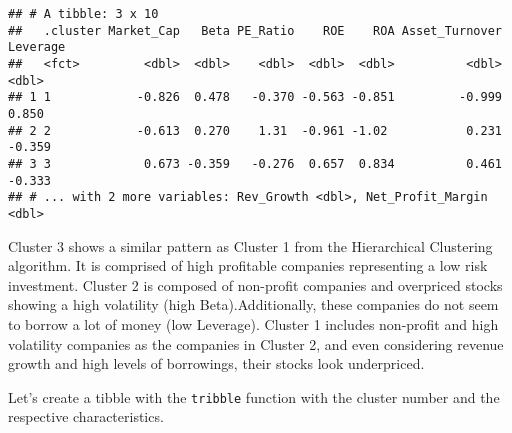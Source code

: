 \documentclass[]{article}
\newenvironment{Shaded}{\begin{snugshade}}{\end{snugshade}}
\newcommand{\KeywordTok}[1]{\textcolor[rgb]{0.13,0.29,0.53}{\textbf{#1}}}
\newcommand{\DataTypeTok}[1]{\textcolor[rgb]{0.13,0.29,0.53}{#1}}
\newcommand{\DecValTok}[1]{\textcolor[rgb]{0.00,0.00,0.81}{#1}}
\newcommand{\StringTok}[1]{\textcolor[rgb]{0.31,0.60,0.02}{#1}}
\newcommand{\CommentTok}[1]{\textcolor[rgb]{0.56,0.35,0.01}{\textit{#1}}}
\newcommand{\OperatorTok}[1]{\textcolor[rgb]{0.81,0.36,0.00}{\textbf{#1}}}
\newcommand{\NormalTok}[1]{#1}
\begin{document}
\begin{verbatim}
## # A tibble: 3 x 10
##   .cluster Market_Cap   Beta PE_Ratio    ROE    ROA Asset_Turnover Leverage
##   <fct>         <dbl>  <dbl>    <dbl>  <dbl>  <dbl>          <dbl>    <dbl>
## 1 1            -0.826  0.478   -0.370 -0.563 -0.851         -0.999    0.850
## 2 2            -0.613  0.270    1.31  -0.961 -1.02           0.231   -0.359
## 3 3             0.673 -0.359   -0.276  0.657  0.834          0.461   -0.333
## # ... with 2 more variables: Rev_Growth <dbl>, Net_Profit_Margin <dbl>
\end{verbatim}

Cluster 3 shows a similar pattern as Cluster 1 from the Hierarchical
Clustering algorithm. It is comprised of high profitable companies
representing a low risk investment. Cluster 2 is composed of non-profit
companies and overpriced stocks showing a high volatility (high
Beta).Additionally, these companies do not seem to borrow a lot of money
(low Leverage). Cluster 1 includes non-profit and high volatility
companies as the companies in Cluster 2, and even considering revenue
growth and high levels of borrowings, their stocks look underpriced.

Let's create a tibble with the \texttt{tribble} function with the
cluster number and the respective characteristics.

\begin{Shaded}
\end{Shaded}
\end{document}
